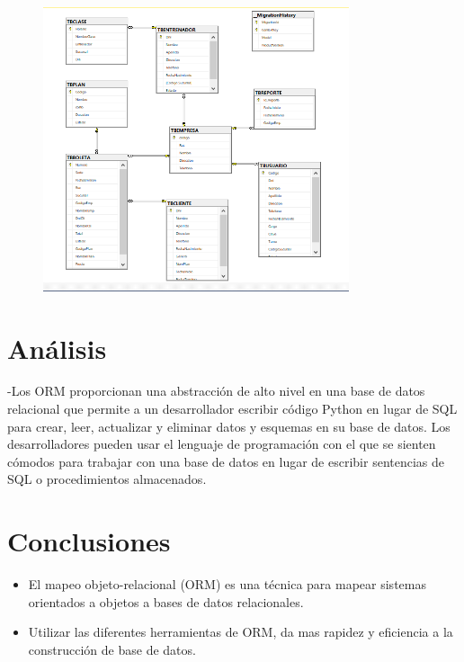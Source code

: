 \documentclass[%
 reprint,
 amsmath,amssymb,
 aps,
]{revtex4-1}
\begin{document}
\begin{itemize}
\\
\\
\\
\\
\\
\begin{figure}[htb]
\begin{center}
\includegraphics[width=9cm]{./Imagenes/6}
\end{center}
\end{figure}

\end{itemize}

\section {Análisis}\label{sec:5}
-Los ORM proporcionan una abstracción de alto nivel en una base de datos relacional que permite a un desarrollador escribir código Python en lugar de SQL para crear, leer, actualizar y eliminar datos y esquemas en su base de datos. Los desarrolladores pueden usar el lenguaje de programación con el que se sienten cómodos para trabajar con una base de datos en lugar de escribir sentencias de SQL o procedimientos almacenados.

\section{Conclusiones}\label{sec:6}


\begin{itemize}
	\item El mapeo objeto-relacional (ORM) es una técnica para mapear sistemas orientados a objetos a bases de datos relacionales.
	\item Utilizar las diferentes herramientas de ORM, da mas rapidez y eficiencia a la construcción de base de datos.
\end{itemize}





\end{document}
